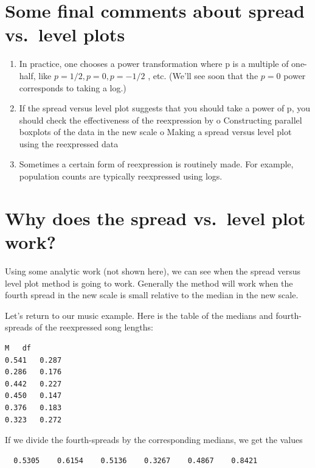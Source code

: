 \documentclass[
]{book}
\begin{document}
\hypertarget{some-final-comments-about-spread-vs.-level-plots}{%
\section{Some final comments about spread vs.~level plots}\label{some-final-comments-about-spread-vs.-level-plots}}

\begin{enumerate}
\def\labelenumi{\arabic{enumi}.}
\item
  In practice, one chooses a power transformation where p is a multiple of one-half, like \(p = 1/2, p = 0, p = -1/2\) , etc. (We'll see soon that the \(p = 0\) power corresponds to taking a log.)
\item
  If the spread versus level plot suggests that you should take a power of p, you should check the effectiveness of the reexpression by
  o Constructing parallel boxplots of the data in the new scale
  o Making a spread versus level plot using the reexpressed data
\item
  Sometimes a certain form of reexpression is routinely made. For example, population counts are typically reexpressed using logs.
\end{enumerate}

\hypertarget{why-does-the-spread-vs.-level-plot-work}{%
\section{Why does the spread vs.~level plot work?}\label{why-does-the-spread-vs.-level-plot-work}}

Using some analytic work (not shown here), we can see when the spread versus level plot method is going to work. Generally the method will work when the fourth spread in the new scale is small relative to the median in the new scale.

Let's return to our music example. Here is the table of the medians and fourth-spreads of the reexpressed song lengths:

\begin{verbatim}
M   df
0.541   0.287
0.286   0.176
0.442   0.227
0.450   0.147
0.376   0.183
0.323   0.272
\end{verbatim}

If we divide the fourth-spreads by the corresponding medians, we get the values

\begin{verbatim}
  0.5305    0.6154    0.5136    0.3267    0.4867    0.8421
\end{verbatim}
\end{document}
